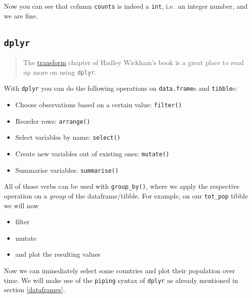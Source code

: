 \documentclass[]{book}
\providecommand{\tightlist}{%
  \setlength{\itemsep}{0pt}\setlength{\parskip}{0pt}}
\theoremstyle{definition}
\theoremstyle{definition}
\theoremstyle{definition}
\theoremstyle{remark}
\begin{document}
Now you can see that column \texttt{counts} is indeed a \texttt{int},
i.e.~an integer number, and we are fine.

\subsection{\texorpdfstring{\texttt{dplyr}}{dplyr}}\label{dplyr}

\begin{quote}
The \href{http://r4ds.had.co.nz/transform.html}{transform} chapter of
Hadley Wickham's book is a great place to read up more on using
\texttt{dplyr}.
\end{quote}

With \texttt{dplyr} you can do the following operations on
\texttt{data.frame}s and \texttt{tibble}s:

\begin{itemize}
\tightlist
\item
  Choose observations based on a certain value: \texttt{filter()}
\item
  Reorder rows: \texttt{arrange()}
\item
  Select variables by name: \texttt{select()}
\item
  Create new variables out of existing ones: \texttt{mutate()}
\item
  Summarise variables: \texttt{summarise()}
\end{itemize}

All of those verbs can be used with \texttt{group\_by()}, where we apply
the respective operation on a \emph{group} of the dataframe/tibble. For
example, on our \texttt{tot\_pop} tibble we will now

\begin{itemize}
\tightlist
\item
  filter
\item
  mutate
\item
  and plot the resulting values
\end{itemize}

Now we can immediately select some countries and plot their population
over time. We will make use of the \texttt{piping} syntax of
\texttt{dplyr} as already mentioned in section \ref{dataframes}.
\end{document}
